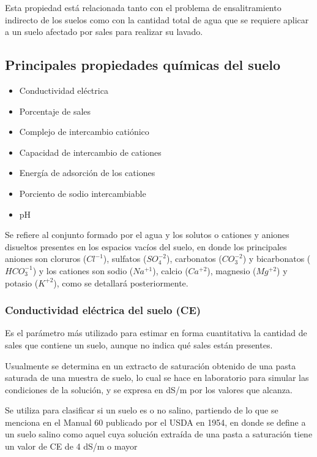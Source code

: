 Esta propiedad está relacionada tanto con el problema de ensalitramiento indirecto de los suelos como con la cantidad total de agua que se requiere aplicar a un suelo afectado por sales para realizar su lavado.

\subsection{Principales propiedades químicas del suelo}
\begin{itemize}
\item Conductividad eléctrica
\item Porcentaje de sales
\item Complejo de intercambio catiónico
\item Capacidad de intercambio de cationes
\item Energía de adsorción de los cationes
\item Porciento de sodio intercambiable
\item pH
\end{itemize}
\begin{definition}
Se refiere al conjunto formado por el agua y los solutos o cationes y aniones disueltos presentes en los espacios vacíos del suelo, en donde los principales aniones son cloruros ($Cl^{-1}$), sulfatos ($SO_4^{-2}$), carbonatos ($CO_3^{-2}$) y bicarbonatos ($HCO_3^{-1}$) y los cationes son sodio ($Na^{+1}$), calcio ($Ca^{+2}$), magnesio ($Mg^{+2}$) y potasio ($K^{+2}$), como se detallará posteriormente.
\end{definition}
\subsubsection{Conductividad eléctrica del suelo (CE)}
Es el parámetro más utilizado para estimar en forma cuantitativa la cantidad de sales que contiene un suelo, aunque no indica qué sales están presentes.

Usualmente se determina en un extracto de saturación obtenido de una pasta saturada de una muestra de suelo, lo cual se hace en laboratorio para simular las condiciones de la solución, y se expresa en dS/m por los valores que alcanza.

Se utiliza para clasificar si un suelo es o no salino, partiendo de lo que se menciona en el Manual 60 publicado por el USDA en 1954, en donde se define a un suelo salino como aquel cuya solución extraída de una pasta a saturación tiene un valor de CE de 4 dS/m o mayor

